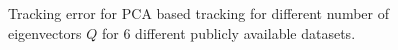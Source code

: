 \begin{figure}[h!]
\caption{Tracking error for PCA based tracking for different number of eigenvectors $Q$ for 6 different publicly available datasets.}
\label{fig:trk_pca}
\end{figure}

\clearpage
\newpage
